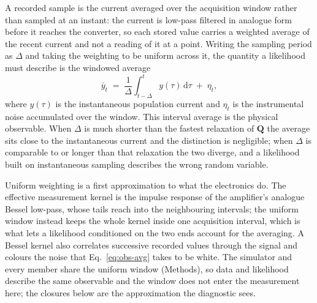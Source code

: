 A recorded sample is the current averaged over the acquisition window rather than sampled at an
instant: the current is low-pass filtered in analogue form before it reaches the converter, so
each stored value carries a weighted average of the recent current and not a reading of it at a
point. Writing the sampling period as $\Delta$ and taking the weighting to be uniform across it,
the quantity a likelihood must describe is the windowed average
\begin{equation}
  \bar{y}_t \;=\; \frac{1}{\Delta}\int_{t-\Delta}^{t} y(\tau)\,\mathrm{d}\tau \;+\; \eta_t,
  \label{eq:obs-avg}
\end{equation}
where $y(\tau)$ is the instantaneous population current and $\eta_t$ is the instrumental
noise accumulated over the window. This interval average is the physical observable. When
$\Delta$ is much shorter than the fastest relaxation of $\mathbf{Q}$ the average sits close
to the instantaneous current and the distinction is negligible; when $\Delta$ is comparable
to or longer than that relaxation the two diverge, and a likelihood built on instantaneous
sampling describes the wrong random variable.

Uniform weighting is a first approximation to what the electronics do. The effective measurement
kernel is the impulse response of the amplifier's analogue Bessel low-pass, whose tails reach into
the neighbouring intervals; the uniform window instead keeps the whole kernel inside one
acquisition interval, which is what lets a likelihood conditioned on the two ends account for the
averaging. A Bessel kernel also correlates successive recorded values through the signal and colours the noise that
Eq.~\ref{eq:obs-avg} takes to be white. The simulator and every member share the uniform window
(Methods), so data and likelihood describe the same observable and the window does not enter the
measurement here; the closures below are the approximation the diagnostic sees.

